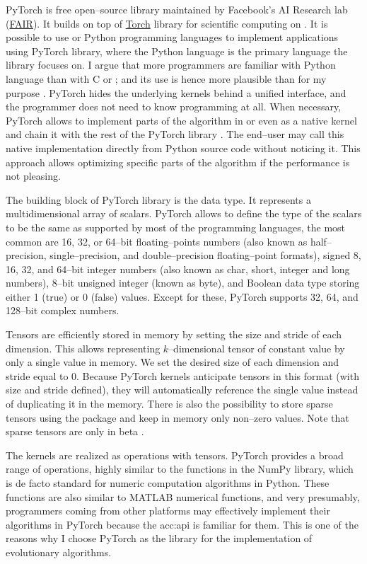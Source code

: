 PyTorch is free open--source library maintained by Facebook's AI Research lab (\href{https://ai.facebook.com/}{FAIR}). It builds on top of \href{http://torch.ch/}{Torch} library for scientific computing on \gpuns. It is possible to use \cpp or Python programming languages to implement applications using PyTorch library, where the Python language is the primary language the library focuses on. I argue that more programmers are familiar with Python language than with C or \cppns; and its use is hence more plausible than \cuda for my purpose \citep{StackOverflowSurvey}. PyTorch hides the underlying kernels behind a unified interface, and the programmer does not need to know \cuda programming at all. When necessary, PyTorch allows to implement parts of the algorithm in \cpp or even as a native \cuda kernel and chain it with the rest of the PyTorch library \citep{PyTorchDoc}. The end--user may call this native implementation directly from Python source code without noticing it. This approach allows optimizing specific parts of the algorithm if the performance is not pleasing.

The building block of PyTorch library is the  data type. It represents a multidimensional array of scalars. PyTorch allows to define the type of the scalars to be the same as supported by most of the programming languages, the most common are 16, 32, or 64--bit floating--points numbers (also known as half--precision, single--precision, and double--precision floating--point formats), signed 8, 16, 32, and 64--bit integer numbers (also known as char, short, integer and long numbers), 8--bit unsigned integer (known as byte), and Boolean data type storing either 1 (true) or 0 (false) values. Except for these, PyTorch supports 32, 64, and 128--bit complex numbers.

Tensors are efficiently stored in memory by setting the size and stride of each dimension. This allows representing $k$--dimensional tensor of constant value by only a single value in memory. We set the desired size of each dimension and stride equal to $0$. Because PyTorch kernels anticipate tensors in this format (with size and stride defined), they will automatically reference the single value instead of duplicating it in the memory. There is also the possibility to store sparse tensors using the  package and keep in memory only non--zero values. Note that sparse tensors are only in beta \citep{PyTorchDoc}.

The kernels are realized as operations with tensors. PyTorch provides a broad range of operations, highly similar to the functions in the NumPy library, which is de facto standard for numeric computation algorithms in Python. These functions are also similar to MATLAB numerical functions, and very presumably, programmers coming from other platforms may effectively implement their algorithms in PyTorch because the \acrshort{acc:api} is familiar for them. This is one of the reasons why I choose PyTorch as the library for the implementation of evolutionary algorithms.

